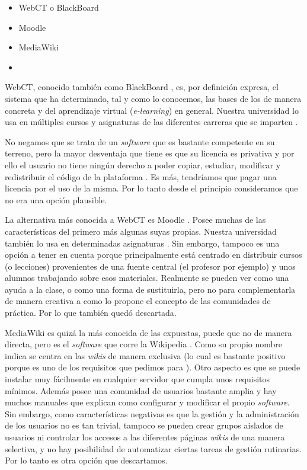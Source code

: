 \begin{itemize}
\item WebCT o BlackBoard
\item Moodle
\item MediaWiki
\item \tiki{}
\end{itemize}

WebCT, conocido también como BlackBoard \cite{web:blackboard}, es, por definición expresa, el sistema que ha determinado, tal y como lo conocemos, las bases de los \lms{} de manera concreta y del aprendizaje virtual (\textit{e-learning}) en general. Nuestra universidad lo usa en múltiples cursos y asignaturas de las diferentes carreras que se imparten \cite{web:webct-uah}.

No negamos que se trata de un \textit{software} que es bastante competente en su terreno, pero la mayor desventaja que tiene es que su licencia es privativa y por ello el usuario no tiene ningún derecho a poder copiar, estudiar, modificar y redistribuir el código de la plataforma \cite[pág~2]{paper:innovamos}. Es más, tendríamos que pagar una licencia por el uso de la misma. Por lo tanto desde el principio consideramos que no era una opción plausible. 

La alternativa más conocida a WebCT es Moodle \cite{web:moodle}. Posee muchas de las características del primero más algunas suyas propias. Nuestra universidad también lo usa en determinadas asignaturas \cite{web:moodle-uah}. Sin embargo, tampoco es una opción a tener en cuenta porque principalmente está centrado en distribuir cursos (o lecciones) provenientes de una fuente central (el profesor por ejemplo) y unos alumnos trabajando sobre esos materiales. Realmente se pueden ver como una ayuda a la clase, o como una forma de sustituirla, pero no para complementarla de manera creativa a como lo propone el concepto de las comunidades de práctica. Por lo que también quedó descartada.

MediaWiki \cite{web:mediawiki} es quizá la más conocida de las expuestas, puede que no de manera directa, pero es el \textit{software} que corre la Wikipedia \cite{web:wikipedia}.
Como su propio nombre indica se centra en las \textit{wikis} de manera exclusiva (lo cual es bastante positivo porque es uno de los requisitos que pedimos para \alma{}). Otro aspecto es que se puede instalar muy fácilmente en cualquier servidor que cumpla unos requisitos mínimos. Además posee una comunidad de usuarios bastante amplia y hay muchos manuales que explican como configurar y modificar el propio \textit{software}. Sin embargo, como características negativas es que la gestión y la administración de los usuarios no es tan trivial, tampoco se pueden crear grupos aislados de usuarios ni controlar los accesos a las diferentes páginas \textit{wikis} de una manera selectiva, y no hay posibilidad de automatizar ciertas tareas de gestión rutinarias. Por lo tanto es otra opción que descartamos.

